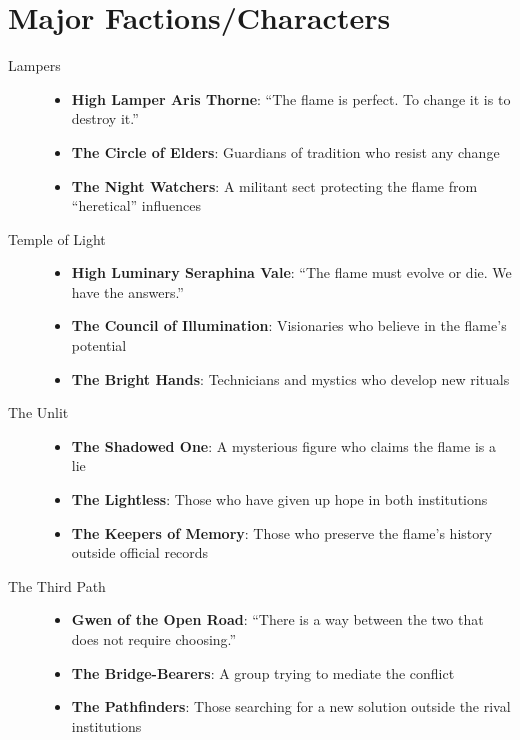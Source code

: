 \documentclass[12pt]{article}
\begin{document}
\section{Major Factions/Characters}

\begin{description}
    \item[Lampers]
    \begin{itemize}
        \item \textbf{High Lamper Aris Thorne}: ``The flame is perfect. To change it is to destroy it.''
        \item \textbf{The Circle of Elders}: Guardians of tradition who resist any change
        \item \textbf{The Night Watchers}: A militant sect protecting the flame from ``heretical'' influences
    \end{itemize}
    
    \item[Temple of Light]
    \begin{itemize}
        \item \textbf{High Luminary Seraphina Vale}: ``The flame must evolve or die. We have the answers.''
        \item \textbf{The Council of Illumination}: Visionaries who believe in the flame's potential
        \item \textbf{The Bright Hands}: Technicians and mystics who develop new rituals
    \end{itemize}
    
    \item[The Unlit]
    \begin{itemize}
        \item \textbf{The Shadowed One}: A mysterious figure who claims the flame is a lie
        \item \textbf{The Lightless}: Those who have given up hope in both institutions
        \item \textbf{The Keepers of Memory}: Those who preserve the flame's history outside official records
    \end{itemize}
    
    \item[The Third Path]
    \begin{itemize}
        \item \textbf{Gwen of the Open Road}: ``There is a way between the two that does not require choosing.''
        \item \textbf{The Bridge-Bearers}: A group trying to mediate the conflict
        \item \textbf{The Pathfinders}: Those searching for a new solution outside the rival institutions
    \end{itemize}
\end{description}
\end{document}

